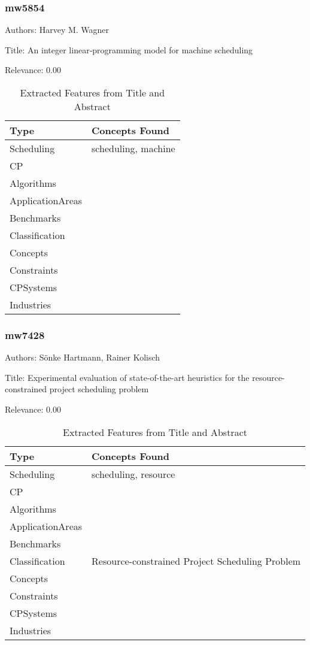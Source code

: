 \subsubsection{mw5854}
\label{mw:mw5854}

Authors: Harvey M. Wagner

Title: An integer linear‐programming model for machine scheduling

Relevance:  0.00

{\scriptsize
\begin{longtable}{p{2cm}p{20cm}}
\caption{Extracted Features from Title and Abstract}\\ \toprule
Type & Concepts Found\\ \midrule
\endhead
\bottomrule
\endfoot
Scheduling & scheduling, machine\\ 
CP & \\ 
Algorithms & \\ 
ApplicationAreas & \\ 
Benchmarks & \\ 
Classification & \\ 
Concepts & \\ 
Constraints & \\ 
CPSystems & \\ 
Industries & \\ 
\end{longtable}
}



\subsubsection{mw7428}
\label{mw:mw7428}

Authors: Sönke Hartmann, Rainer Kolisch

Title: Experimental evaluation of state-of-the-art heuristics for the resource-constrained project scheduling problem

Relevance:  0.00

{\scriptsize
\begin{longtable}{p{2cm}p{20cm}}
\caption{Extracted Features from Title and Abstract}\\ \toprule
Type & Concepts Found\\ \midrule
\endhead
\bottomrule
\endfoot
Scheduling & scheduling, resource\\ 
CP & \\ 
Algorithms & \\ 
ApplicationAreas & \\ 
Benchmarks & \\ 
Classification & Resource-constrained Project Scheduling Problem\\ 
Concepts & \\ 
Constraints & \\ 
CPSystems & \\ 
Industries & \\ 
\end{longtable}
}



